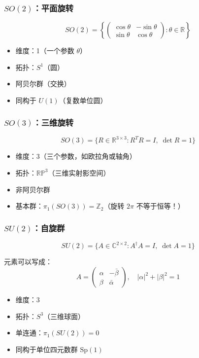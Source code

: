 \subsubsection{$SO(2)$：平面旋转}

\[
SO(2) = \left\{\begin{pmatrix} \cos\theta & -\sin\theta \\ \sin\theta & \cos\theta \end{pmatrix} : \theta \in \mathbb{R}\right\}
\]

\begin{itemize}
  \item 维度：1（一个参数 $\theta$）
  \item 拓扑：$S^1$（圆）
  \item 阿贝尔群（交换）
  \item 同构于 $U(1)$（复数单位圆）
\end{itemize}

\subsubsection{$SO(3)$：三维旋转}

\[
SO(3) = \{R \in \mathbb{R}^{3\times 3} : R^TR = I,\; \det R = 1\}
\]

\begin{itemize}
  \item 维度：3（三个参数，如欧拉角或轴角）
  \item 拓扑：$\mathbb{RP}^3$（三维实射影空间）
  \item 非阿贝尔群
  \item 基本群：$\pi_1(SO(3)) = \mathbb{Z}_2$（旋转 $2\pi$ 不等于恒等！）
\end{itemize}

\subsubsection{$SU(2)$：自旋群}

\[
SU(2) = \{A \in \mathbb{C}^{2\times 2} : A^\dagger A = I,\; \det A = 1\}
\]

元素可以写成：
\[
A = \begin{pmatrix} \alpha & -\bar{\beta} \\ \beta & \bar{\alpha} \end{pmatrix}, \quad |\alpha|^2 + |\beta|^2 = 1
\]

\begin{itemize}
  \item 维度：3
  \item 拓扑：$S^3$（三维球面）
  \item 单连通：$\pi_1(SU(2)) = 0$
  \item 同构于单位四元数群 $\text{Sp}(1)$
\end{itemize}

